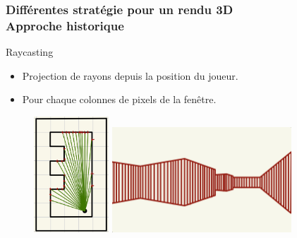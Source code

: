 \documentclass{beamer}
\begin{document}
\begin{frame}
    \frametitle{Différentes stratégie pour un rendu 3D \\
                \small Approche historique}
    \begin{block}{Raycasting}
        \begin{itemize}
            \item Projection de rayons depuis la position du joueur.
            \item Pour chaque colonnes de pixels de la fenêtre.
        \end{itemize}
    \end{block}

    \begin{figure}
        \center
        \includegraphics[width=0.25\textwidth]{images/projection2D.jpeg}
        \raisebox{2cm}{
            \hspace{2mm}$\Longrightarrow$\hspace{2mm}
        }
        \includegraphics[width=0.6\textwidth]{images/rendu-historique.jpg}
    \end{figure}
\end{frame}
\end{document}
